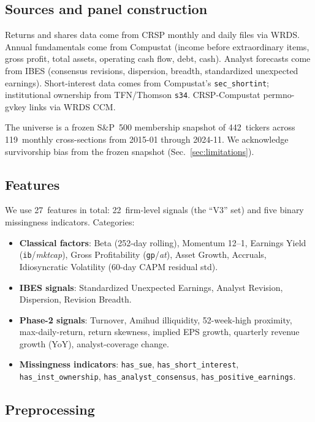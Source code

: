 \documentclass[11pt]{article}
\begin{document}
\subsection{Sources and panel construction}

Returns and shares data come from CRSP monthly and daily files via
WRDS. Annual fundamentals come from Compustat (income before
extraordinary items, gross profit, total assets, operating cash flow,
debt, cash). Analyst forecasts come from IBES (consensus revisions,
dispersion, breadth, standardized unexpected earnings).
Short-interest data comes from Compustat's
\texttt{sec\_shortint}; institutional ownership from
TFN/Thomson \texttt{s34}. CRSP-Compustat permno-gvkey links via WRDS
CCM.

The universe is a frozen S\&P~500 membership snapshot of 442~tickers
across 119~monthly cross-sections from 2015-01 through 2024-11. We
acknowledge survivorship bias from the frozen snapshot
(Sec.~\ref{sec:limitations}).

\subsection{Features}

We use 27~features in total: 22~firm-level signals (the ``V3'' set) and
five binary missingness indicators. Categories:

\begin{itemize}[leftmargin=2em,topsep=2pt,itemsep=2pt]
\item \textbf{Classical factors}: Beta (252-day rolling), Momentum
  12--1, Earnings Yield (\texttt{ib}/\textit{mktcap}), Gross
  Profitability (\texttt{gp}/\textit{at}), Asset Growth, Accruals,
  Idiosyncratic Volatility (60-day CAPM residual std).
\item \textbf{IBES signals}: Standardized Unexpected Earnings,
  Analyst Revision, Dispersion, Revision Breadth.
\item \textbf{Phase-2 signals}: Turnover, Amihud illiquidity,
  52-week-high proximity, max-daily-return, return skewness, implied
  EPS growth, quarterly revenue growth (YoY), analyst-coverage change.
\item \textbf{Missingness indicators}: \texttt{has\_sue},
  \texttt{has\_short\_interest}, \texttt{has\_inst\_ownership},
  \texttt{has\_analyst\_consensus}, \texttt{has\_positive\_earnings}.
\end{itemize}

\subsection{Preprocessing}
\end{document}
